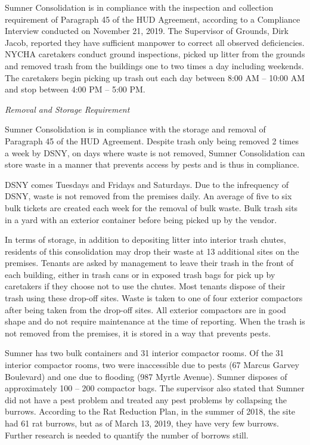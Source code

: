 Sumner Consolidation is in compliance with the inspection and collection requirement of  Paragraph 45 of the HUD Agreement, according to a Compliance Interview conducted on November 21, 2019. The Supervisor of Grounds, Dirk Jacob, reported they have sufficient manpower to correct all observed deficiencies. NYCHA caretakers conduct ground inspections, picked up litter from the grounds and removed trash from the buildings one to two times a day including weekends. The caretakers begin picking up trash out each day between 8:00 AM -- 10:00 AM and stop between 4:00 PM -- 5:00 PM.  

\emph{Removal and Storage Requirement}

Sumner Consolidation is in compliance with the storage and removal of Paragraph 45 of the HUD Agreement. Despite trash only being removed 2 times a week by DSNY, on days where waste is not removed, Sumner Consolidation can store waste in a manner that prevents access by pests and is thus in compliance.  

DSNY comes Tuesdays and Fridays and Saturdays. Due to the infrequency of DSNY, waste is not removed from the premises daily. An average of five to six bulk tickets are created each week for the removal of bulk waste. Bulk trash sits in a yard with an exterior container before being picked up by the vendor. 

In terms of storage, in addition to depositing litter into interior trash chutes, residents of this consolidation may drop their waste at 13 additional sites on the premises. Tenants are asked by management to leave their trash in the front of each building, either in trash cans or in exposed trash bags for pick up by caretakers if they choose not to use the chutes. Most tenants dispose of their trash using these drop-off sites. Waste is taken to one of four exterior compactors after being taken from the drop-off sites. All exterior compactors are in good shape and do not require maintenance at the time of reporting. When the trash is not removed from the premises, it is stored in a way that prevents pests. 

Sumner has two bulk containers and 31 interior compactor rooms. Of the 31 interior compactor rooms, two were inaccessible due to pests (67 Marcus Garvey Boulevard) and one due to flooding (987 Myrtle Avenue). Sumner disposes of approximately 100 -- 200 compactor bags. The supervisor also stated that Sumner did not have a pest problem and treated any pest problems by collapsing the burrows. According to the Rat Reduction Plan, in the summer of 2018, the site had 61 rat burrows, but as of March 13, 2019, they have very few burrows. Further research is needed to quantify the number of borrows still. 

